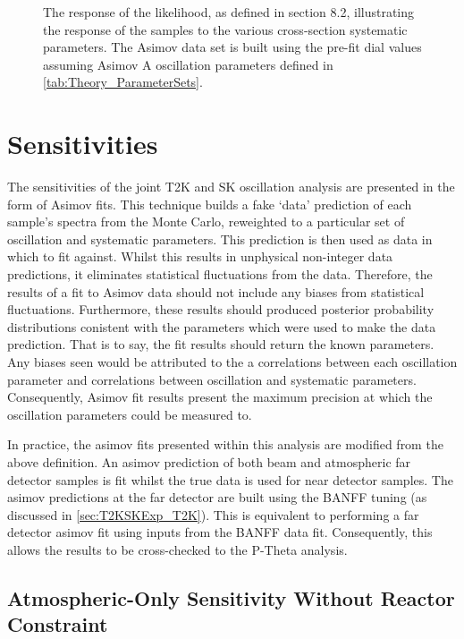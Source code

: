 \begin{figure}[h]
\begin{subfigure}[t]{0.5\textwidth}
  \end{subfigure}
  \caption{The response of the likelihood, as defined in section 8.2, illustrating the response of the samples to the various cross-section systematic parameters. The Asimov data set is built using the pre-fit dial values assuming Asimov A oscillation parameters defined in \autoref{tab:Theory_ParameterSets}.}
  \label{fig:OscillationAnalysis_LLHScanSystPars}
\end{figure}

\clearpage
\section{Sensitivities}
\label{sec:OscillationAnalysis_Sensitivities}

The sensitivities of the joint T2K and SK oscillation analysis are presented in the form of Asimov fits. This technique builds a fake `data' prediction of each sample's spectra from the Monte Carlo, reweighted to a particular set of oscillation and systematic parameters. This prediction is then used as data in which to fit against. Whilst this results in unphysical non-integer data predictions, it eliminates statistical fluctuations from the data. Therefore, the results of a fit to Asimov data should not include any biases from statistical fluctuations. Furthermore, these results should produced posterior probability distributions conistent with the parameters which were used to make the data prediction. That is to say, the fit results should return the known parameters. Any biases seen would be attributed to the a correlations between each oscillation parameter and correlations between oscillation and systematic parameters. Consequently, Asimov fit results present the maximum precision at which the oscillation parameters could be measured to.

In practice, the asimov fits presented within this analysis are modified from the above definition. An asimov prediction of both beam and atmospheric far detector samples is fit whilst the true data is used for near detector samples. The asimov predictions at the far detector are built using the BANFF tuning (as discussed in \autoref{sec:T2KSKExp_T2K}). This is equivalent to performing a far detector asimov fit using inputs from the BANFF data fit. Consequently, this allows the results to be cross-checked to the P-Theta analysis.

\subsection{Atmospheric-Only Sensitivity Without Reactor Constraint}
\label{sec:OscillationAnalysis_SKOnly}

